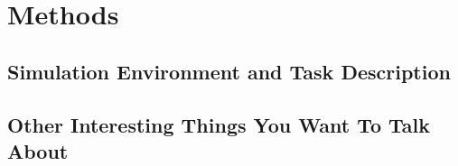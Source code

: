 \section{Methods} \label{section:methods}

\subsection{Simulation Environment and Task Description}

\subsection{Other Interesting Things You Want To Talk About}
